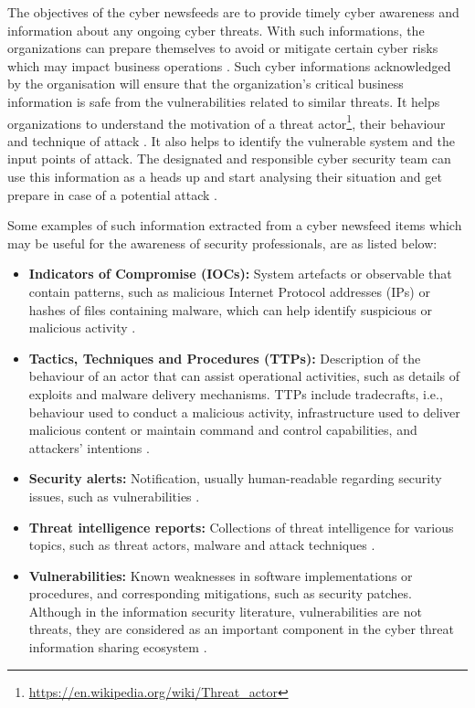The objectives of the cyber newsfeeds are to provide timely cyber awareness and information about  any ongoing cyber threats. With such informations, the organizations can prepare themselves to avoid or mitigate certain cyber risks which may impact business operations \citep{ring2014threat}. 
Such cyber informations acknowledged by the organisation  will ensure that the organization’s critical business information is safe from the vulnerabilities related to similar threats.
It helps organizations to understand the motivation of a threat actor\footnote{\url{https://en.wikipedia.org/wiki/Threat_actor}}, 
their behaviour and technique of attack \citep{jouini2014classification}. 
It also helps to identify the vulnerable system and the input points of attack. 
The designated and responsible cyber security team can use this information as a heads up and start analysing their situation and get prepare in case of a potential attack \citep{chismon2015threat}. 

Some examples of such information extracted from a cyber newsfeed items which may be useful for the awareness of security professionals, are as listed below:
\begin{itemize}
    \item \textbf{Indicators of Compromise (IOCs):} 
    System artefacts or observable that contain patterns, 
    such as malicious Internet Protocol addresses (IPs) or hashes of files containing malware, 
    which can help identify suspicious or malicious activity \citep{hyeisuncyber}.
    
    \item \textbf{Tactics, Techniques and Procedures (TTPs): }
    Description of the behaviour of an actor that can assist operational activities, such as details of exploits and malware delivery mechanisms. TTPs include tradecrafts, i.e., behaviour used to conduct a malicious activity, infrastructure used to deliver malicious content or maintain command and control capabilities, and attackers’ intentions 
    \citep{shahi2018tactics}. 
    
    \item \textbf{Security alerts:} 
    Notification, usually human-readable regarding security issues, such as vulnerabilities 
    \citep[page 189]{RFC2828}. 
    
    \item \textbf{Threat intelligence reports:} 
    Collections of threat intelligence for various topics, such as threat actors, malware and attack techniques 
    \citep{ring2014threat}. 
   
    
    \item \textbf{Vulnerabilities:} 
    Known weaknesses in software implementations or procedures, and corresponding mitigations, such as security patches. Although in the information security literature, vulnerabilities are not threats, they are considered as an important component in the cyber threat information sharing ecosystem 
    \citep{rantos2020interoperability}. 
    
\end{itemize}

